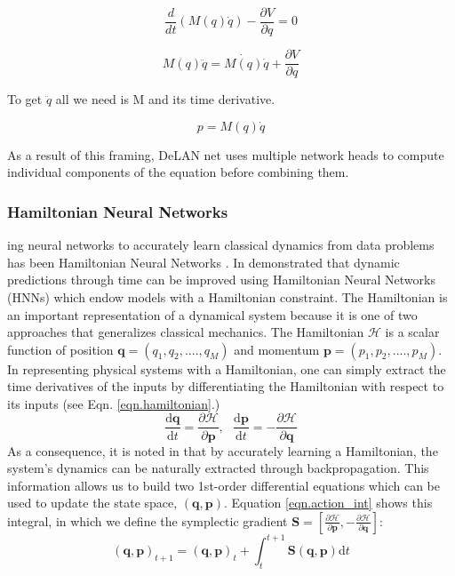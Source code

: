 \documentclass{article}
\begin{document}
$$ \frac{d}{dt} (M(q)\dot{q}) - \frac{\partial V}{\partial q} = 0 $$

$$ M(q)\ddot{q} = \dot{M(q)} \dot{q} + \frac{\partial V}{\partial q} $$

To get $\ddot{q}$ all we need is M and its time derivative. 

$$ p = M(q) \dot{q} $$

As a result of this framing, DeLAN net uses multiple network heads to compute individual components of the equation before combining them. 

\subsubsection*{Hamiltonian Neural Networks}

ing neural networks to accurately learn classical dynamics from data  problems has been Hamiltonian Neural Networks \cite{greydanus_hamiltonian_2019}. In  demonstrated that dynamic predictions through time can be improved using Hamiltonian Neural Networks (HNNs) which endow models with a Hamiltonian constraint. The Hamiltonian is an important representation of a dynamical system because it is one of two approaches that generalizes classical mechanics. The Hamiltonian $\mathcal{H}$ is a scalar function of position $\mathbf{q} = (q_1,q_2,....,q_M)$ and momentum $\mathbf{p} = (p_1,p_2,....,p_M)$. In representing physical systems with a Hamiltonian, one can simply extract the time derivatives of the inputs by differentiating the Hamiltonian with respect to its inputs (see Eqn. \ref{eqn.hamiltonian}.)
\begin{equation}
\frac{\mathrm{d}\mathbf{q}}{\mathrm{d}t} = \frac{\partial \mathcal{H}}{\partial \mathbf{p}}, ~~~
\frac{\mathrm{d}\mathbf{p}}{\mathrm{d}t} = -\frac{\partial \mathcal{H}}{\partial \mathbf{q}}
\label{eqn.hamiltonian}
\end{equation}
As a consequence, it is noted in \cite{greydanus_hamiltonian_2019} that by accurately learning a Hamiltonian, the system's dynamics can be naturally extracted through backpropagation. This information allows us to build two 1st-order differential equations which can be used to update the state space, $(\mathbf{q},\mathbf{p})$. Equation \ref{eqn.action_int} shows this integral, in which we define the symplectic gradient $\mathbf{S}  = \left [ \frac{\partial \mathcal{H}}{\partial \mathbf{p}},-\frac{\partial \mathcal{H}}{\partial \mathbf{q}} \right ] $:
\begin{equation}
(\mathbf{q},\mathbf{p})_{t+1} = (\mathbf{q},\mathbf{p})_t + \int_t^{t+1} \mathbf{S}(\mathbf{q},\mathbf{p}) \mathrm{d}t
\label{eqn.action_int}
\end{equation}
\end{document}
